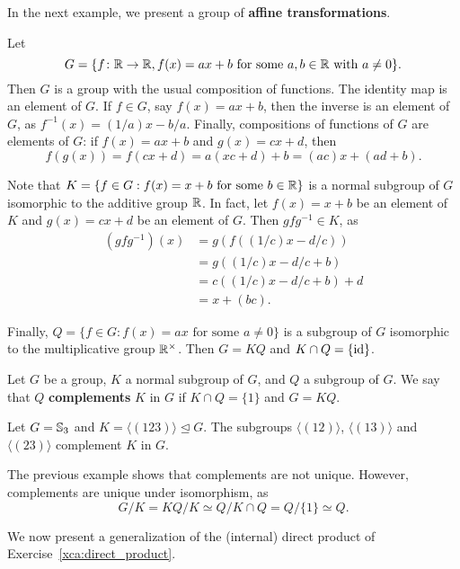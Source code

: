 In the next example, we present a group of \textbf{affine transformations}. 

\begin{example}
\label{exa:affine}
    Let 
    \[ 
    G=\{f\colon\mathbb{R}\to\mathbb{R}, f(x)=ax+b\text{ for some $a,b\in\mathbb{R}$ with $a\ne 0$}\}.
    \]
    Then $G$ is a group with the usual composition of functions. The identity map is an element of $G$. 
    If $f\in G$, say $f(x)=ax+b$, then the inverse is an element of $G$, as 
    $f^{-1}(x)=(1/a)x-b/a$. Finally, compositions of functions of $G$ are elements of $G$: 
    if $f(x)=ax+b$ and $g(x)=cx+d$, then 
    \[
    f(g(x))=f(cx+d)=a(xc+d)+b=(ac)x+(ad+b).
    \]
    
    Note that $K=\{f\in G:f(x)=x+b\text{ for some $b\in\mathbb{R}$}\}$ is a normal subgroup 
    of $G$ isomorphic to the additive group $\mathbb{R}$. In fact, let $f(x)=x+b$ be an element of $K$ 
    and $g(x)=cx+d$ be an element of $G$. Then $gfg^{-1}\in K$, as 
    \begin{align*}
    (gfg^{-1})(x)&=g(f((1/c)x-d/c))\\
    &=g((1/c)x-d/c+b)\\
    &=c( (1/c)x-d/c+b)+d\\
    &=x+(bc).
    \end{align*}
    
    Finally, 
    $Q=\{f\in G:f(x)=ax\text{ for some $a\ne0$}\}$ is a subgroup of $G$ isomorphic to the multiplicative group $\mathbb{R}^{\times}$. 
    Then $G=KQ$ and $K\cap Q=\{\operatorname{id}\}$.
\end{example}

\begin{definition}
Let $G$ be a group, $K$ a normal subgroup of $G$, and $Q$ a subgroup of $G$. We say
that $Q$ \textbf{complements} $K$ in $G$ if $K\cap Q=\{1\}$ and $G=KQ$.
\end{definition}

\begin{example}
Let $G=\mathbb{S}_3$ and $K=\langle (123)\rangle\unlhd G$. The subgroups
$\langle (12)\rangle$, $\langle
(13)\rangle$ and $\langle (23)\rangle$ complement $K$ in $G$.
\end{example}

The previous example shows that complements are not unique. However, 
complements are unique under isomorphism, as 
\[
G/K= KQ/K\simeq Q/K\cap Q=Q/\{1\}\simeq Q.
\]

We now present a generalization of the (internal) direct product of
Exercise~\ref{xca:direct_product}. 

